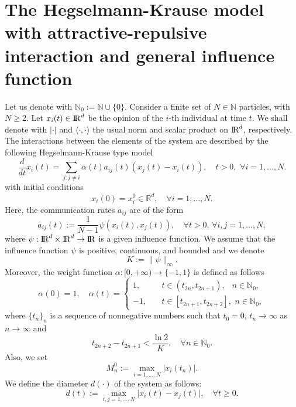 \documentclass[a4paper,11pt,oneside]{article}
\newcommand{\N}{\mathbb N}
\newcommand{\RR}{{{\rm I} \kern -.15em {\rm R} }}
\begin{document}
	\section{The Hegselmann-Krause model with attractive-repulsive interaction and general  influence function}
	Let us denote with $\mathbb{N}_0:=	\mathbb{N}\cup \{0\}$. Consider a finite set of $N\in\N$ particles, with $N\geq 2 $. Let $x_{i}(t)\in \RR^d$ be the opinion of the $i$-th individual at time $t$. We shall denote with $\lvert\cdot \rvert$ and $\langle\cdot,\cdot\rangle$ the usual norm and scalar product on $\RR^{d}$, respectively. The interactions between the elements of the system are described by the following  Hegselmann-Krause type model 
	\begin{equation}\label{onoff}
		\frac{d}{dt}x_{i}(t)=\underset{j:j\neq i}{\sum}\alpha(t) a_{ij}(t)(x_{j}(t)-x_{i}(t)),\quad t>0,	\,\, \forall i=1,\dots,N.
	\end{equation}
	with initial conditions
	\begin{equation}\label{incond}
		x_{i}(0)=x^{0}_{i}\in \mathbb{R}^{d},\quad \forall i=1,\dots,N.
	\end{equation}
Here, the communication rates $a_{ij}$ are of the form
	\begin{equation}\label{weight}
		a_{ij}(t):=\frac{1}{N-1}\psi( x_{i}(t), x_{j}(t)), \quad\forall t>0,\, \forall i,j=1,\dots,N,
	\end{equation}
	where $\psi:\RR^d\times\RR^d\rightarrow \RR$ is a given influence function. We assume that the influence function $\psi$ is positive, continuous, and bounded and we denote 
	\begin{equation}\label{K}
		K:=\lVert \psi\rVert_{\infty}.
	\end{equation} 
Moreover, the weight function $\alpha:[0,+\infty)\rightarrow\{-1,1\}$ is defined as follows
	\begin{equation}\label{alpha1}
		\alpha(0)=1,\quad\alpha(t)=\begin{cases}
			1,\quad &t\in \left(t_{2n},t_{2n+1}\right), \,\ \, \ n\in \mathbb{N}_{0},\\-1,\quad &t\in \left[t_{2n+1},t_{2n+2}\right], \,\, n\in \mathbb{N}_{0},
		\end{cases}
	\end{equation}
	where $\{t_{n}\}_{n}$ is a sequence of nonnegative numbers such that $t_{0}=0$, $t_{n}\to \infty$ as $n\to \infty$ and 
	\begin{equation}\label{tn}
		t_{2n+2}-t_{2n+1}<\frac{\ln 2}{K},\quad \forall n\in \mathbb{N}_{0}.
	\end{equation}
	Also, we set
	\begin{equation}\label{M0}
		M_{n}^{0}:=\max_{i=1,\dots,N}\lvert x_{i}(t_{n})\rvert.
	\end{equation}
	We define the diameter $d(\cdot)$ of the system as follows:
	$$d(t):=\max_{i,j=1,\dots,N}\lvert x_{i}(t)-x_{j}(t)\rvert,\quad \forall t\geq 0.$$
	
\end{document}
